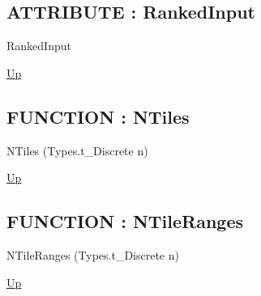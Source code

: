 \par
\par
\subsection*{ATTRIBUTE : RankedInput}
\hypertarget{ecldoc:ml_core.fieldaggregates.rankedinput}{}
\begin{minipage}[t]{\textwidth}
\begin{flushleft}
 RankedInput 
\end{flushleft}
\end{minipage}
\hyperlink{ecldoc:ml_core.fieldaggregates}{Up}

\par
\par
\subsection*{FUNCTION : NTiles}
\hypertarget{ecldoc:ml_core.fieldaggregates.ntiles}{}
\begin{minipage}[t]{\textwidth}
\begin{flushleft}
 NTiles (Types.t\_Discrete n)
\end{flushleft}
\end{minipage}
\hyperlink{ecldoc:ml_core.fieldaggregates}{Up}

\par
\par
\subsection*{FUNCTION : NTileRanges}
\hypertarget{ecldoc:ml_core.fieldaggregates.ntileranges}{}
\begin{minipage}[t]{\textwidth}
\begin{flushleft}
 NTileRanges (Types.t\_Discrete n)
\end{flushleft}
\end{minipage}
\hyperlink{ecldoc:ml_core.fieldaggregates}{Up}

\par
\par

